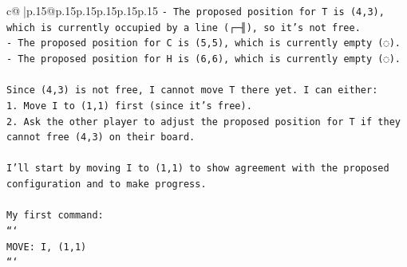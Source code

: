 \documentclass{article}
\begin{document}
{\begin{supertabular}{c@{$\;$}|p{.15\linewidth}@{}p{.15\linewidth}p{.15\linewidth}p{.15\linewidth}p{.15\linewidth}p{.15\linewidth}}
{{{\texttt{{-} The proposed position for T is (4,3), which is currently occupied by a line (┌─╢), so it's not free.} \\
\texttt{{-} The proposed position for C is (5,5), which is currently empty (◌).} \\
\texttt{{-} The proposed position for H is (6,6), which is currently empty (◌).} \\
\\ 
\texttt{Since (4,3) is not free, I cannot move T there yet. I can either:} \\
\texttt{1. Move I to (1,1) first (since it's free).} \\
\texttt{2. Ask the other player to adjust the proposed position for T if they cannot free (4,3) on their board.} \\
\\ 
\texttt{I'll start by moving I to (1,1) to show agreement with the proposed configuration and to make progress.} \\
\\ 
\texttt{My first command:} \\
\texttt{```} \\
\texttt{MOVE: I, (1,1)} \\
\texttt{```} \\
            }
        }
    }
     \\ \\


\end{supertabular}}
\end{document}
